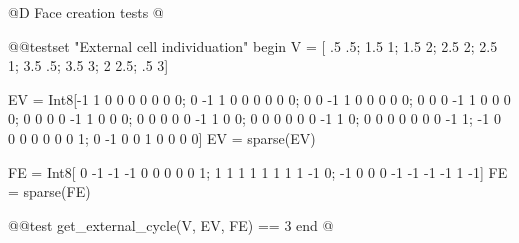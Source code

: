 @D Face creation tests
@{@@testset "External cell individuation" begin
    V = [ .5 .5;  1.5   1;  1.5  2; 
         2.5  2;  2.5   1;  3.5 .5;
         3.5  3;    2 2.5;   .5  3]

    EV = Int8[-1  1  0  0  0  0  0  0  0;
               0 -1  1  0  0  0  0  0  0;
               0  0 -1  1  0  0  0  0  0;
               0  0  0 -1  1  0  0  0  0;
               0  0  0  0 -1  1  0  0  0;
               0  0  0  0  0 -1  1  0  0;
               0  0  0  0  0  0 -1  1  0;
               0  0  0  0  0  0  0 -1  1;
              -1  0  0  0  0  0  0  0  1;
               0 -1  0  0  1  0  0  0  0]
    EV = sparse(EV)
    
    FE = Int8[ 0 -1 -1 -1  0  0  0  0  0  1;
               1  1  1  1  1  1  1  1 -1  0;
              -1  0  0  0 -1 -1 -1 -1  1 -1]
    FE = sparse(FE)

    @@test get_external_cycle(V, EV, FE) == 3
end
@}
